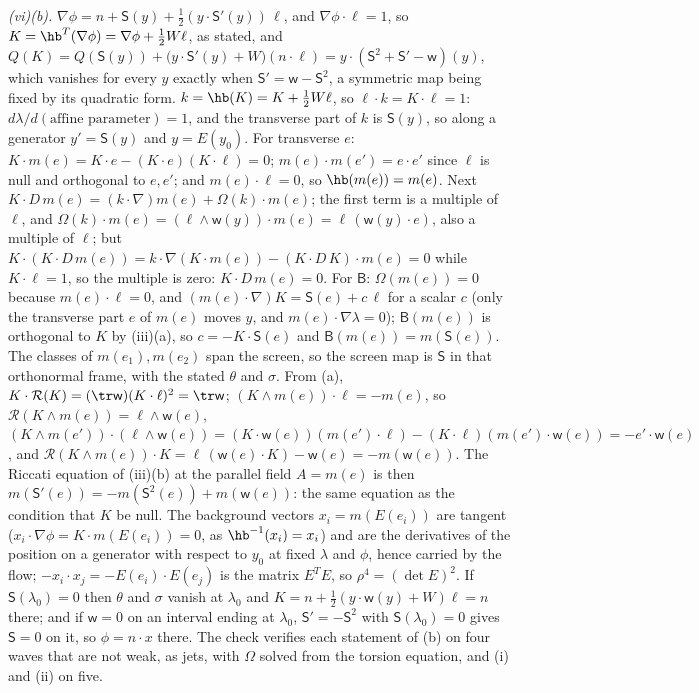 \emph{(vi)(b).} $\nabla\phi = n + \mathsf{S}(y) + \tfrac12(y \cdot \mathsf{S}'(y))\,\ell$, and $\nabla\phi \cdot \ell = 1$, so $K = \hb^{T}(\nabla\phi) = \nabla\phi + \tfrac12 W\ell$, as stated, and $Q(K) = Q(\mathsf{S}(y)) + \bigl(y \cdot \mathsf{S}'(y) + W\bigr)(n \cdot \ell) = y \cdot (\mathsf{S}^{2} + \mathsf{S}' - \mathsf{w})(y)$, which vanishes for every $y$ exactly when $\mathsf{S}' = \mathsf{w} - \mathsf{S}^{2}$, a symmetric map being fixed by its quadratic form. $k = \hb(K) = K + \tfrac12 W\ell$, so $\ell \cdot k = K \cdot \ell = 1$: $d\lambda/d(\text{affine parameter}) = 1$, and the transverse part of $k$ is $\mathsf{S}(y)$, so along a generator $y' = \mathsf{S}(y)$ and $y = E(y_{0})$. For transverse $e$: $K \cdot m(e) = K \cdot e - (K \cdot e)(K \cdot \ell) = 0$; $m(e) \cdot m(e') = e \cdot e'$ since $\ell$ is null and orthogonal to $e, e'$; and $m(e) \cdot \ell = 0$, so $\hb(m(e)) = m(e)$. Next $K \cdot D\,m(e) = (k \cdot \nabla)m(e) + \Omega(k) \cdot m(e)$; the first term is a multiple of $\ell$, and $\Omega(k) \cdot m(e) = (\ell \wedge \mathsf{w}(y)) \cdot m(e) = \ell\,(\mathsf{w}(y) \cdot e)$, also a multiple of $\ell$; but $K \cdot (K \cdot D\,m(e)) = k \cdot \nabla(K \cdot m(e)) - (K \cdot D\,K) \cdot m(e) = 0$ while $K \cdot \ell = 1$, so the multiple is zero: $K \cdot D\,m(e) = 0$. For $\mathsf{B}$: $\Omega(m(e)) = 0$ because $m(e) \cdot \ell = 0$, and $(m(e) \cdot \nabla)K = \mathsf{S}(e) + c\,\ell$ for a scalar $c$ (only the transverse part $e$ of $m(e)$ moves $y$, and $m(e) \cdot \nabla\lambda = 0$); $\mathsf{B}(m(e))$ is orthogonal to $K$ by (iii)(a), so $c = -K \cdot \mathsf{S}(e)$ and $\mathsf{B}(m(e)) = m(\mathsf{S}(e))$. The classes of $m(e_{1}), m(e_{2})$ span the screen, so the screen map is $\mathsf{S}$ in that orthonormal frame, with the stated $\theta$ and $\sigma$. From (a), $K \cdot \mathcal{R}(K) = (\tr\mathsf{w})(K \cdot \ell)^{2} = \tr\mathsf{w}$; $(K \wedge m(e)) \cdot \ell = -m(e)$, so $\mathcal{R}(K \wedge m(e)) = \ell \wedge \mathsf{w}(e)$, $(K \wedge m(e')) \cdot (\ell \wedge \mathsf{w}(e)) = (K \cdot \mathsf{w}(e))(m(e') \cdot \ell) - (K \cdot \ell)(m(e') \cdot \mathsf{w}(e)) = -e' \cdot \mathsf{w}(e)$, and $\mathcal{R}(K \wedge m(e)) \cdot K = \ell\,(\mathsf{w}(e) \cdot K) - \mathsf{w}(e) = -m(\mathsf{w}(e))$. The Riccati equation of (iii)(b) at the parallel field $A = m(e)$ is then $m(\mathsf{S}'(e)) = -m(\mathsf{S}^{2}(e)) + m(\mathsf{w}(e))$: the same equation as the condition that $K$ be null. The background vectors $x_{i} = m(E(e_{i}))$ are tangent ($x_{i} \cdot \nabla\phi = K \cdot m(E(e_{i})) = 0$, as $\hb^{-1}(x_{i}) = x_{i}$) and are the derivatives of the position on a generator with respect to $y_{0}$ at fixed $\lambda$ and $\phi$, hence carried by the flow; $-x_{i} \cdot x_{j} = -E(e_{i}) \cdot E(e_{j})$ is the matrix $E^{T}E$, so $\rho^{4} = (\det E)^{2}$. If $\mathsf{S}(\lambda_{0}) = 0$ then $\theta$ and $\sigma$ vanish at $\lambda_{0}$ and $K = n + \tfrac12(y \cdot \mathsf{w}(y) + W)\ell = n$ there; and if $\mathsf{w} = 0$ on an interval ending at $\lambda_{0}$, $\mathsf{S}' = -\mathsf{S}^{2}$ with $\mathsf{S}(\lambda_{0}) = 0$ gives $\mathsf{S} = 0$ on it, so $\phi = n \cdot x$ there. The check verifies each statement of (b) on four waves that are not weak, as jets, with $\Omega$ solved from the torsion equation, and (i) and (ii) on five.
